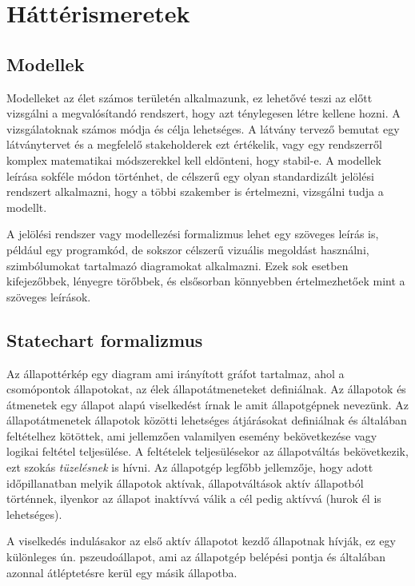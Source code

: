 \chapter{Háttérismeretek}
\section{Modellek}

Modelleket az élet számos területén alkalmazunk, ez lehetővé teszi az előtt vizsgálni a megvalósítandó rendszert, hogy azt ténylegesen létre kellene hozni. A vizsgálatoknak számos módja és célja lehetséges. A látvány tervező bemutat egy látványtervet és a megfelelő stakeholderek ezt értékelik, vagy egy rendszerről komplex matematikai módszerekkel kell eldönteni, hogy stabil-e. A modellek leírása sokféle módon történhet, de célszerű egy olyan standardizált jelölési rendszert alkalmazni, hogy a többi szakember is értelmezni, vizsgálni tudja a modellt.

A jelölési rendszer vagy modellezési formalizmus lehet egy szöveges leírás is, például egy programkód, de sokszor célszerű vizuális megoldást használni, szimbólumokat tartalmazó diagramokat alkalmazni. Ezek sok esetben kifejezőbbek, lényegre törőbbek, és elsősorban könnyebben értelmezhetőek mint a szöveges leírások.

\section{Statechart formalizmus}

Az állapottérkép egy diagram ami irányított gráfot tartalmaz, ahol a csomópontok állapotokat, az élek állapotátmeneteket definiálnak. Az állapotok és átmenetek egy állapot alapú viselkedést írnak le amit állapotgépnek nevezünk. Az állapotátmenetek állapotok közötti lehetséges átjárásokat definiálnak és általában feltételhez kötöttek, ami jellemzően valamilyen esemény bekövetkezése vagy logikai feltétel teljesülése. A feltételek teljesülésekor az állapotváltás bekövetkezik, ezt szokás \emph{tüzelésnek} is hívni. Az állapotgép legfőbb jellemzője, hogy adott időpillanatban melyik állapotok aktívak, állapotváltások aktív állapotból történnek, ilyenkor az állapot inaktívvá válik a cél pedig aktívvá (hurok él is lehetséges).

A viselkedés indulásakor az első aktív állapotot kezdő állapotnak hívják, ez egy különleges ún. pszeudoállapot, ami az állapotgép belépési pontja és általában azonnal átléptetésre kerül egy másik állapotba.

